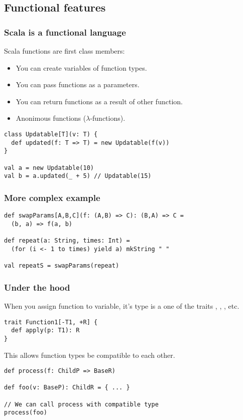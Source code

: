 \subsection{Functional features}

\begin{frame}[fragile]
\frametitle{Scala is a functional language}
  Scala functions are first class members:
  \begin{itemize}
    \item You can create variables of function types.
    \item You can pass functions as a parameters.
    \item You can return functions as a result of other function.
    \item Anonimous functions ($\lambda$-functions).
  \end{itemize}
  \begin{example}
\begin{lstlisting}
class Updatable[T](v: T) {
  def updated(f: T => T) = new Updatable(f(v))
}

val a = new Updatable(10)
val b = a.updated(_ + 5) // Updatable(15)
\end{lstlisting}
  \end{example}
\end{frame}

\begin{frame}[fragile]
\frametitle{More complex example}

    \begin{lstlisting}
def swapParams[A,B,C](f: (A,B) => C): (B,A) => C = 
  (b, a) => f(a, b)

def repeat(a: String, times: Int) = 
  (for (i <- 1 to times) yield a) mkString " "

val repeatS = swapParams(repeat)
    \end{lstlisting}

\end{frame}

\begin{frame}[fragile]
\frametitle{Under the hood}

When you assign function to variable, it's type is a one of the traits , , , etc.
\begin{lstlisting}
trait Function1[-T1, +R] {
  def apply(p: T1): R
}
\end{lstlisting}
This allows function types be compatible to each other.
\begin{example}
\begin{lstlisting}
def process(f: ChildP => BaseR)

def foo(v: BaseP): ChildR = { ... }

// We can call process with compatible type
process(foo)
\end{lstlisting}
\end{example}

\end{frame}

